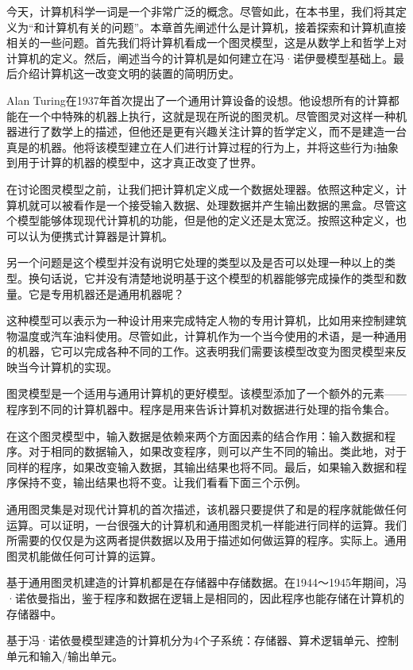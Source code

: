 
今天，计算机科学一词是一个非常广泛的概念。尽管如此，在本书里，我们将其定义为“和计算机有关的问题”。本章首先阐述什么是计算机，接着探索和计算机直接相关的一些问题。首先我们将计算机看成一个图灵模型，这是从数学上和哲学上对计算机的定义。然后，阐述当今的计算机是如何建立在冯·诺伊曼模型基础上。最后介绍计算机这一改变文明的装置的简明历史。

Alan Turing在1937年首次提出了一个通用计算设备的设想。他设想所有的计算都能在一个中特殊的机器上执行，这就是现在所说的图灵机。尽管图灵对这样一种机器进行了数学上的描述，但他还是更有兴趣关注计算的哲学定义，而不是建造一台真是的机器。他将该模型建立在人们进行计算过程的行为上，并将这些行为i抽象到用于计算的机器的模型中，这才真正改变了世界。

在讨论图灵模型之前，让我们把计算机定义成一个数据处理器。依照这种定义，计算机就可以被看作是一个接受输入数据、处理数据并产生输出数据的黑盒。尽管这个模型能够体现现代计算机的功能，但是他的定义还是太宽泛。按照这种定义，也可以认为便携式计算器是计算机。

另一个问题是这个模型并没有说明它处理的类型以及是否可以处理一种以上的类型。换句话说，它并没有清楚地说明基于这个模型的机器能够完成操作的类型和数量。它是专用机器还是通用机器呢？


这种模型可以表示为一种设计用来完成特定人物的专用计算机，比如用来控制建筑物温度或汽车油料使用。尽管如此，计算机作为一个当今使用的术语，是一种通用的机器，它可以完成各种不同的工作。这表明我们需要该模型改变为图灵模型来反映当今计算机的实现。

图灵模型是一个适用与通用计算机的更好模型。该模型添加了一个额外的元素——程序到不同的计算机器中。程序是用来告诉计算机对数据进行处理的指令集合。

在这个图灵模型中，输入数据是依赖来两个方面因素的结合作用：输入数据和程序。对于相同的数据输入，如果改变程序，则可以产生不同的输出。类此地，对于同样的程序，如果改变输入数据，其输出结果也将不同。最后，如果输入数据和程序保持不变，输出结果也将不变。让我们看看下面三个示例。

通用图灵集是对现代计算机的首次描述，该机器只要提供了和是的程序就能做任何运算。可以证明，一台很强大的计算机和通用图灵机一样能进行同样的运算。我们所需要的仅仅是为这两者提供数据以及用于描述如何做运算的程序。实际上。通用图灵机能做任何可计算的运算。

基于通用图灵机建造的计算机都是在存储器中存储数据。在1944～1945年期间，冯·诺依曼指出，鉴于程序和数据在逻辑上是相同的，因此程序也能存储在计算机的存储器中。

基于冯·诺依曼模型建造的计算机分为4个子系统：存储器、算术逻辑单元、控制单元和输入/输出单元。

